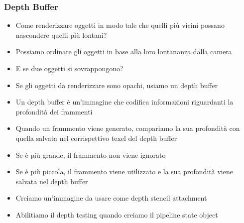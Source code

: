 \begin{frame}
\frametitle{Depth Buffer}
\begin{itemize}
\item Come renderizzare oggetti in modo tale che quelli più vicini possano nascondere quelli più lontani?
\item Possiamo ordinare gli oggetti in base alla loro lontananza dalla camera
\item E se due oggetti si sovrappongono?
\item Se gli oggetti da renderizzare sono opachi, usiamo un depth buffer
\item Un depth buffer è un'immagine che codifica informazioni riguardanti la profondità dei frammenti
\item Quando un frammento viene generato, compariamo la sua profondità con quella salvata nel corrispettivo texel del depth buffer
\item Se è più grande, il frammento non viene ignorato
\item Se è più piccola, il frammento viene utilizzato e la sua profondità viene salvata nel depth buffer
\item Creiamo un'immagine da usare come depth stencil attachment
\item Abilitiamo il depth testing quando creiamo il pipeline state object
\end{itemize}
\end{frame}
